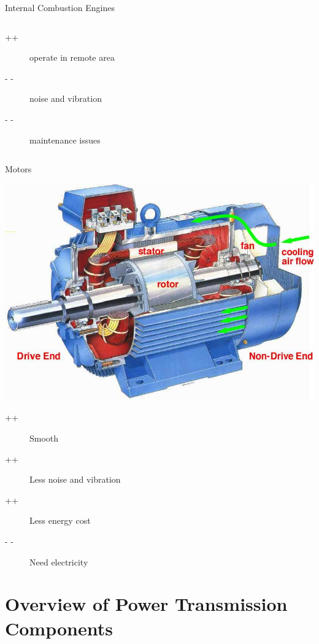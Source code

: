 \documentclass[
svgnames,
handout,
10pt,
]{beamer}
\begin{document}
\begin{frame}{Internal Combustion Engines}
\begin{columns}
\begin{column}{0.5\textwidth}
\begin{figure}[htbp]
      \end{figure}
      \begin{description}
      \item[++] operate in remote area
      \item[- -] noise and vibration
      \item[- -] maintenance issues
      \end{description}
    \end{column}
  \end{columns}
\end{frame}

\begin{frame}{Motors}

  \centering
  \includegraphics[height=0.6\textheight]{pictures/motor-section}

  \begin{description}
  \item[++] Smooth
  \item[++] Less noise and vibration
  \item[++] Less energy cost
  \item[- -] Need electricity
  \end{description}
  
\end{frame}

\section{Overview of Power Transmission Components}
\end{document}
